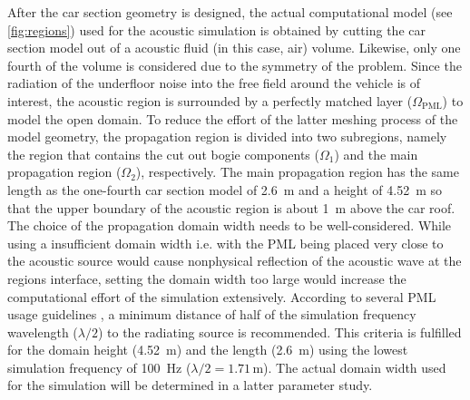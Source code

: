 After the car section geometry is designed, the actual computational model (see \cref{fig:regions}) used for the acoustic simulation is obtained by cutting the car section model out of a acoustic fluid (in this case, air) volume. Likewise, only one fourth of the volume is considered due to the symmetry of the problem. Since the radiation of the underfloor noise into the free field around the vehicle is of interest, the acoustic region is surrounded by a perfectly matched layer ($\Omega_{\text{PML}}$) to model the open domain. To reduce the effort of the latter meshing process of the model geometry, the propagation region is divided into two subregions, namely the region that contains the cut out bogie components ($\Omega_1$) and the main propagation region ($\Omega_2$), respectively. The main propagation region has the same length as the one-fourth car section model of \SI{2.6}{\meter} and a height of \SI{4.52}{\meter} so that the upper boundary of the acoustic region is about \SI{1}{\meter} above the car roof. The choice of the propagation domain width needs to be well-considered. While using a insufficient domain width i.e. with the PML being placed very close to the acoustic source would cause nonphysical reflection of the acoustic wave at the regions interface, setting the domain width too large would increase the computational effort of the simulation extensively. According to several PML usage guidelines \cite{PML_comsol, PML_quickwave, PML_3ds}, a minimum distance of half of the simulation frequency wavelength ($\lambda/2$) to the radiating source is recommended. This criteria is fulfilled for the domain height (\SI{4.52}{\meter}) and the length (\SI{2.6}{\meter}) using the lowest simulation frequency of \SI{100}{\hertz} ($\lambda / 2 = 1.71\,\text{m}$). The actual domain width used for the simulation will be determined in a latter parameter study.

